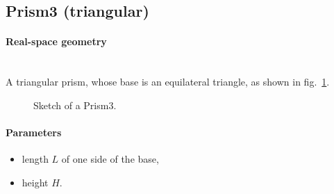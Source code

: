 \newpage
\subsection{Prism3 (triangular)} 

\paragraph{Real-space geometry}\strut\\
A triangular prism, whose base is an equilateral
triangle, as shown in fig.~\ref{fig:prism3}.

\begin{figure}[ht]
\hfill
{}
\hfill
{}
\hfill
\caption{Sketch of a Prism3.}
\label{fig:prism3}
\end{figure}

\FloatBarrier

\paragraph{Parameters}
\begin{itemize}
\item length $L$ of one side of the base, 
\item height $H$.
\end{itemize}

